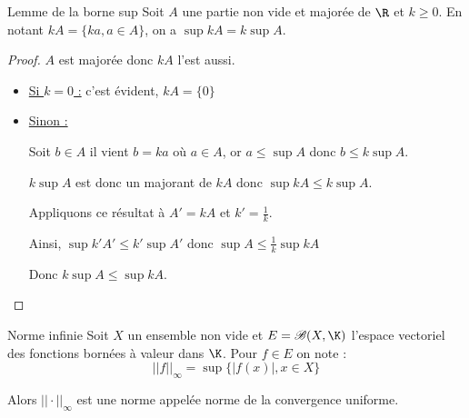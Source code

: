 \begin{theoreme}{Lemme de la borne sup}{}
    Soit $A$ une partie non vide et majorée de $\R$ et $k \geqslant 0$. 
    En notant $kA = \{ka, a \in A \}$, on a $\sup kA = k \sup A$.
\end{theoreme}

\begin{proof}
    $A$ est majorée donc $kA$ l'est aussi. 

    \begin{itemize}
        \item \uline{Si $k = 0$ :} c'est évident, $kA = \{0\}$
        \item \uline{Sinon :}

        Soit $b \in A$ il vient $b = ka$ où $a \in A$, or $a \leqslant \sup A$ donc 
        $b \leqslant k \sup A$. 

        $k \sup A$ est donc un majorant de $k A$ donc $\sup k A \leqslant k \sup A$. 

        Appliquons ce résultat à $A' = kA$ et $k' = \frac 1 k$. 

        Ainsi, $\sup k' A' \leqslant k' \sup A'$ donc $\sup A \leqslant \frac 1 k \sup k A$

        Donc $k \sup A \leqslant \sup k A$. 
    \end{itemize}
\end{proof}

\begin{proposition}{Norme infinie}{}
    Soit $X$ un ensemble non vide et $E = \mathscr B(X, \K)$ l'espace vectoriel  des 
    fonctions bornées à valeur dans $\K$. 
    Pour $f \in E$ on note : 
    $$||f||_\infty = \sup \{|f(x)|, x \in X\}$$

    Alors $|| \cdot ||_\infty$ est une norme appelée norme de la convergence uniforme. 
\end{proposition}

